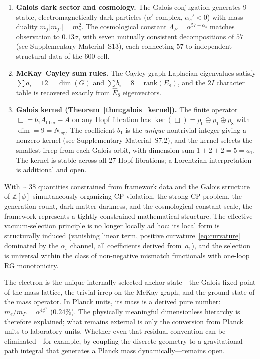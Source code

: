 \documentclass[12pt,a4paper]{article}
\theoremstyle{definition}
\begin{document}
\begin{enumerate}
\item \textbf{Galois dark sector and cosmology.}  The Galois conjugation generates 9 stable, electromagnetically dark particles ($\alpha'$ complex, $\alpha_s' < 0$) with mass duality $m_f |m_{f'}| = m_e^2$.  The cosmological constant $\Lambda_P = \alpha^{57-\alpha_s}$ matches observation to $0.13\sigma$, with seven mutually consistent decompositions of $57$ (see Supplementary Material~S13), each connecting $57$ to independent structural data of the 600-cell.

\item \textbf{McKay--Cayley sum rules.}  The Cayley-graph Laplacian eigenvalues satisfy $\sum a_i = 12 = \dim(G)$ and $\sum b_i = 8 = \text{rank}(E_8)$, and the $2I$ character table is recovered exactly from $\hat{E}_8$ eigenvectors.

\item \textbf{Galois kernel (Theorem~\ref{thm:galois_kernel}).}  The finite operator $\Box = b_1 A_{\text{fiber}} - A$ on any Hopf fibration has $\ker(\Box) = \rho_0 \oplus \rho_1 \oplus \rho_8$ with $\dim = 9 = N_{\text{eig}}$.  The coefficient $b_1$ is the \emph{unique} nontrivial integer giving a nonzero kernel (see Supplementary Material~S7.2), and the kernel selects the smallest irrep from each Galois orbit, with dimension sum $1 + 2 + 2 = 5 = a_1$.  The kernel is stable across all 27 Hopf fibrations; a Lorentzian interpretation is additional and open.
\end{enumerate}

With ${\sim}\,38$ quantities constrained from framework data and the Galois structure of $\mathbb{Z}[\phi]$ simultaneously organizing CP violation, the strong CP problem, the generation count, dark matter darkness, and the cosmological constant scale, the framework represents a tightly constrained mathematical structure.  The effective vacuum-selection principle is no longer locally ad hoc: its local form is structurally induced (vanishing linear term, positive curvature~\eqref{eq:curvature} dominated by the $\alpha_s$ channel, all coefficients derived from~$a_1$), and the selection is universal within the class of non-negative mismatch functionals with one-loop RG monotonicity.

The electron is the unique internally selected anchor state---the Galois fixed point of the mass lattice, the trivial irrep on the McKay graph, and the ground state of the mass operator.  In Planck units, its mass is a derived pure number: $m_e/m_P = \alpha^{4\phi^2}$ ($0.24\%$).  The physically meaningful dimensionless hierarchy is therefore explained; what remains external is only the conversion from Planck units to laboratory units.  Whether even that residual convention can be eliminated---for example, by coupling the discrete geometry to a gravitational path integral that generates a Planck mass dynamically---remains open.
\end{document}
